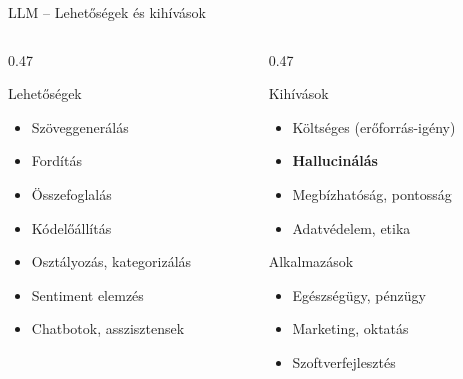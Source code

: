 \documentclass[aspectratio=169, 12pt]{beamer}
\begin{document}
\begin{frame}{LLM -- Lehetőségek és kihívások}
  \footnotesize
  \begin{columns}[T,onlytextwidth]
    \begin{column}{0.47\textwidth}
      \begin{exampleblock}{Lehetőségek}
        \begin{itemize}\setlength{\itemsep}{1pt}
          \item Szöveggenerálás
          \item Fordítás
          \item Összefoglalás
          \item Kódelőállítás
          \item Osztályozás, kategorizálás
          \item Sentiment elemzés
          \item Chatbotok, asszisztensek
        \end{itemize}
      \end{exampleblock}
    \end{column}
    \begin{column}{0.47\textwidth}
      \begin{alertblock}{Kihívások}
        \begin{itemize}\setlength{\itemsep}{1pt}
          \item Költséges (erőforrás-igény)
          \item \textbf{Hallucinálás}
          \item Megbízhatóság, pontosság
          \item Adatvédelem, etika
        \end{itemize}
      \end{alertblock}
      \begin{block}{Alkalmazások}
        \begin{itemize}\setlength{\itemsep}{1pt}
          \item Egészségügy, pénzügy
          \item Marketing, oktatás
          \item Szoftverfejlesztés
        \end{itemize}
      \end{block}
    \end{column}
  \end{columns}
\end{frame}
\end{document}
